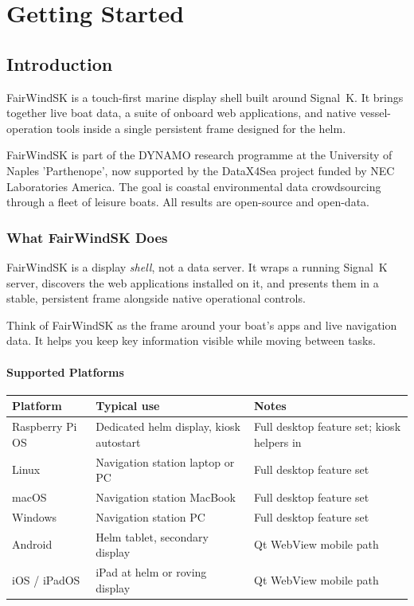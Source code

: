 \part{Getting Started}

\chapter{Introduction}

FairWindSK is a touch-first marine display shell built around Signal~K.
It brings together live boat data, a suite of onboard web applications, and native
vessel-operation tools inside a single persistent frame designed for the helm.

\begin{notebox}
FairWindSK is part of the DYNAMO research programme at the University of Naples
'Parthenope', now supported by the DataX4Sea project funded by NEC Laboratories
America.
The goal is coastal environmental data crowdsourcing through a fleet of leisure
boats.
All results are open-source and open-data.
\end{notebox}

\section{What FairWindSK Does}

FairWindSK is a display \emph{shell}, not a data server.
It wraps a running Signal~K server, discovers the web applications installed on it,
and presents them in a stable, persistent frame alongside native operational controls.

Think of FairWindSK as the frame around your boat's apps and live navigation data.
It helps you keep key information visible while moving between tasks.

\subsection{Supported Platforms}

\begin{longtable}{L{3.0cm}L{4.8cm}L{5.9cm}}
\toprule
{}
\color{white}\sffamily\bfseries Platform &
\color{white}\sffamily\bfseries Typical use &
\color{white}\sffamily\bfseries Notes \\
\midrule
Raspberry Pi OS & Dedicated helm display, kiosk autostart &
  Full desktop feature set; kiosk helpers in  \\
Linux           & Navigation station laptop or PC    & Full desktop feature set \\
macOS           & Navigation station MacBook         & Full desktop feature set \\
Windows         & Navigation station PC              & Full desktop feature set \\
Android         & Helm tablet, secondary display     & Qt WebView mobile path \\
iOS / iPadOS    & iPad at helm or roving display     & Qt WebView mobile path \\
\bottomrule
\end{longtable}

